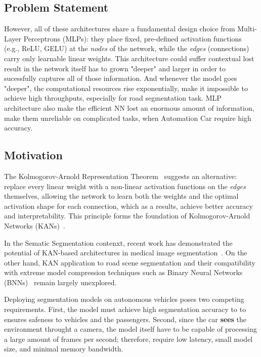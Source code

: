 \documentclass[a4paper]{report}
\begin{document}
\subsection{Problem Statement}
However, all of these architectures share a fundamental design choice from Multi-Layer Perceptrons (MLPs): they place fixed, pre-defined activation functions (e.g., ReLU, GELU) at the \emph{nodes} of the network, while the \emph{edges} (connections) carry only learnable linear weights. This architecture could suffer contextual lost result in the network itself has to grown "deeper" and larger in order to sucessfully captures all of those information. And whenever the model goes "deeper", the computational resources rise exponentially, make it impossible to achieve high throughputs, especially for road segmentation task. MLP architecture also make the efficient NN lost an enormous amount of information, make them unreliable on complicated tasks, when Automation Car require high accuracy. 

\subsection{Motivation}
The Kolmogorov-Arnold Representation Theorem~\cite{kolmogorov1957, arnold2009} suggests an alternative: replace every linear weight with a non-linear activation functions on the \emph{edges} themselves, allowing the network to learn both the weights and the optimal activation shape for each connection, which as a results, achieve better accuracy and interpretability. This principle forms the foundation of Kolmogorov-Arnold Networks (KANs)~\cite{liu2024kan}.

In the Sematic Segmentation contenxt, recent work has demonstrated the potential of KAN-based architectures in medical image segmentation~\cite{li2024ukan}. On the other hand,  KAN application to road scene segmentation and their compatibility with extreme model compression techniques such as Binary Neural Networks (BNNs)~\cite{qin2020bireal, liu2020reactnet} remain largely unexplored.

Deploying segmentation models on autonomous vehicles poses two competing requirements. First, the model must achieve high segmentation accuracy to to ensures safeness to vehicles and the passengers. Second, since the car \textbf{sees} the environment throught a camera, the model itself have to be capable of processing a large amount of frames per second; therefore, require low latency, small model size, and minimal memory bandwidth.
\end{document}

